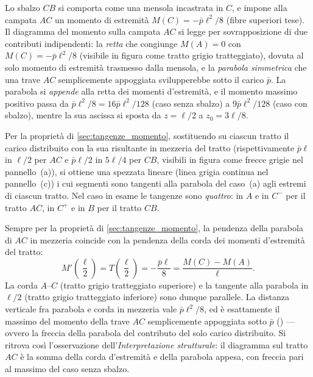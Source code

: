 \begin{esempio}
\begin{svolgimento}
		Lo sbalzo $CB$ si comporta come una mensola
		incastrata in $C$, e impone alla campata $AC$ un
		momento di estremità $M(C) = -\bar p\ell^2/8$
		(fibre superiori tese). Il diagramma del momento
		sulla campata $AC$ si legge per sovrapposizione di
		due contributi indipendenti: la \emph{retta} che
		congiunge $M(A)=0$ con $M(C) = -\bar p\ell^2/8$
		(visibile in figura come tratto grigio tratteggiato),
		dovuta al solo momento di estremità trasmesso dalla
		mensola, e la \emph{parabola simmetrica} che una
		trave $AC$ semplicemente appoggiata svilupperebbe
		sotto il carico $\bar p$. La parabola si
		\emph{appende} alla retta dei momenti d'estremità,
		e il momento massimo positivo passa da
		$\bar p\ell^2/8 = 16\bar p\ell^2/128$ (caso senza
		sbalzo) a $9\bar p\ell^2/128$ (caso con sbalzo),
		mentre la sua ascissa si sposta da $z = \ell/2$ a
		$z_0 = 3\ell/8$.
		
		Per la proprietà di \ref{sec:tangenze_momento},
		sostituendo su ciascun tratto il carico distribuito
		con la sua risultante in mezzeria del tratto
		(rispettivamente $\bar p\ell$ in $\ell/2$ per $AC$
		e $\bar p\ell/2$ in $5\ell/4$ per $CB$, visibili
		in figura come frecce grigie nel pannello~(a)), si
		ottiene una spezzata lineare (linea grigia continua
		nel pannello~(c)) i cui segmenti sono tangenti alla
		parabola del caso~(a) agli estremi di ciascun
		tratto. Nel caso in esame le tangenze sono
		\emph{quattro}: in $A$ e in $C^-$ per il tratto
		$AC$, in $C^+$ e in $B$ per il tratto $CB$.
		
		Sempre per la proprietà di
		\ref{sec:tangenze_momento}, la pendenza della
		parabola di $AC$ in mezzeria coincide con la
		pendenza della corda dei momenti d'estremità del
		tratto:
		\[
		M'\!\left(\frac{\ell}{2}\right)
		= T\!\left(\frac{\ell}{2}\right)
		= -\frac{\bar p\ell}{8}
		= \frac{M(C) - M(A)}{\ell}.
		\]
		La corda $A$--$C$ (tratto grigio tratteggiato
		superiore) e la tangente alla parabola in $\ell/2$
		(tratto grigio tratteggiato inferiore) sono dunque
		parallele. La distanza verticale fra parabola e
		corda in mezzeria vale $\bar p\ell^2/8$, ed è
		esattamente il massimo del momento della trave
		$AC$ semplicemente appoggiata sotto $\bar p$
		() --- ovvero la
		freccia della parabola del contributo del solo
		carico distribuito. Si ritrova così l'osservazione
		dell'\emph{Interpretazione strutturale}: il
		diagramma sul tratto $AC$ è la somma della corda
		d'estremità e della parabola appesa, con freccia
		pari al massimo del caso senza sbalzo.
		
	\end{svolgimento}
\end{esempio}


